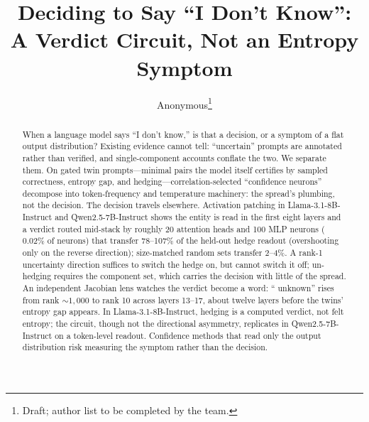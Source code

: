 \documentclass{article}
\title{Deciding to Say ``I Don't Know'':\\A Verdict Circuit, Not an Entropy Symptom}
\author{%
  Anonymous\thanks{Draft; author list to be completed by the team.}%
}
\newcommand{\lm}{Llama-3.1-8B-Instruct}
\newcommand{\qw}{Qwen2.5-7B-Instruct}
\begin{document}
\maketitle

\begin{abstract}
When a language model says ``I don't know,'' is that a decision, or a symptom of a flat output
distribution? Existing evidence cannot tell: ``uncertain'' prompts are annotated rather than verified, and
single-component accounts conflate the two. We separate them. On gated twin prompts---minimal pairs the
model itself certifies by sampled correctness, entropy gap, and hedging---correlation-selected
``confidence neurons'' decompose into token-frequency and temperature machinery: the spread's plumbing, not
the decision. The decision travels elsewhere. Activation patching in \lm{} and \qw{} shows the entity is
read in the first eight layers and a verdict routed mid-stack by roughly 20 attention heads and 100 MLP
neurons ($0.02\%$ of neurons) that transfer 78--107\% of the held-out hedge readout (overshooting only on
the reverse direction); size-matched random sets transfer 2--4\%. A rank-1 uncertainty direction suffices to switch the hedge on, but cannot switch it off;
un-hedging requires the component set, which carries the decision with little of the spread. An independent Jacobian lens watches the
verdict become a word: `` unknown'' rises from rank ${\sim}1{,}000$ to rank 10 across layers 13--17, about
twelve layers before the twins' entropy gap appears. In \lm{}, hedging is a computed verdict, not felt
entropy; the circuit, though not the directional asymmetry, replicates in \qw{} on a token-level
readout. Confidence methods that read only the output distribution risk measuring the symptom rather
than the decision.
\end{abstract}
\end{document}
